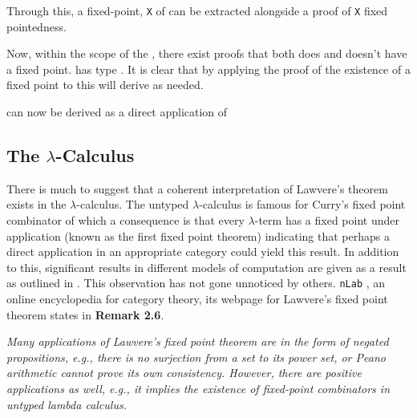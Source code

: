 
Through this, a fixed-point, \verb|X| of  can be extracted alongside a
proof of \verb|X| fixed pointedness.


Now, within the scope of the , there exist proofs that
 both does and doesn't have a fixed point.
 has type . It is clear that by applying
the proof of the existence of a fixed point to this will derive  as
needed.


 can now be derived as a direct application
of 

\begin{AgdaMultiCode}
\end{AgdaMultiCode}
\subsection{The $\lambda$-Calculus}
\label{quote:lambda}
There is much to suggest that a coherent interpretation of Lawvere's theorem
exists in the $\lambda$-calculus. The untyped $\lambda$-calculus is famous for
Curry's fixed point combinator  of which a consequence is that
every $\lambda$-term has a fixed point under application (known as the first
fixed point theorem) indicating that perhaps a direct
application in an appropriate category could yield this result. In addition to
this, significant results in different models of computation are given as a
result as outlined in . This observation has not
gone unnoticed by others. \verb|nLab| , an online encyclopedia
for category theory, its webpage for Lawvere's fixed point
theorem states in \textbf{Remark 2.6}.

\begin{displayquote}
\textit{Many applications of Lawvere’s fixed point theorem are in the form of negated
propositions, e.g., there is no surjection from a set to its power set, or
Peano arithmetic cannot prove its own consistency. However, there are positive
applications as well, e.g., it implies the existence of fixed-point combinators
in untyped lambda calculus.}
\end{displayquote}

